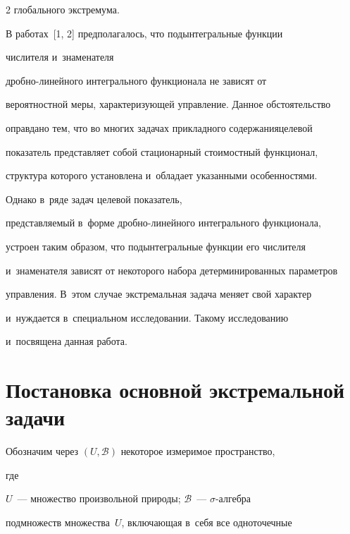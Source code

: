 \begin{multicols}{2}
глобального экстремума. 

     

     В работах~[1, 2] предполагалось, что подынтегральные функции 

числителя и~знаменателя 

     дроб\-но-ли\-ней\-но\-го интегрального функционала не зависят от 

вероятностной меры, характеризующей управ\-ле\-ние. Данное обстоятельство 

оправдано тем, что во многих задачах прикладного содержания\linebreak целевой 

показатель пред\-став\-ля\-ет собой стационарный стоимостный функционал, 

структура которого установлена и~обладает указанными особенностями. 

Однако в~ряде задач целевой показатель, 

представляемый в~форме дроб\-но-ли\-ней\-но\-го интегрального функционала, 

устроен таким образом, что подынтегральные функции его чис\-ли\-те\-ля 

и~знаменателя зависят от некоторого набора детерминированных па\-ра\-мет\-ров 

управления. В~этом случае экстремальная задача меняет свой характер 

и~нуж\-да\-ет\-ся в~специальном исследовании. Такому исследованию 

и~посвящена данная работа.



\vspace*{-6pt}



\section{Постановка основной экстремальной задачи}



\vspace*{-2pt}



     Обозначим через $(U,\mathcal{B})$ некоторое измеримое пространство, 

где  

$U$~--- множество произвольной природы; $\mathcal{B}$~--- $\sigma$-ал\-геб\-ра 

подмножеств множества~$U$, вклю\-ча\-ющая в~себя все одноточечные 


\end{multicols}
